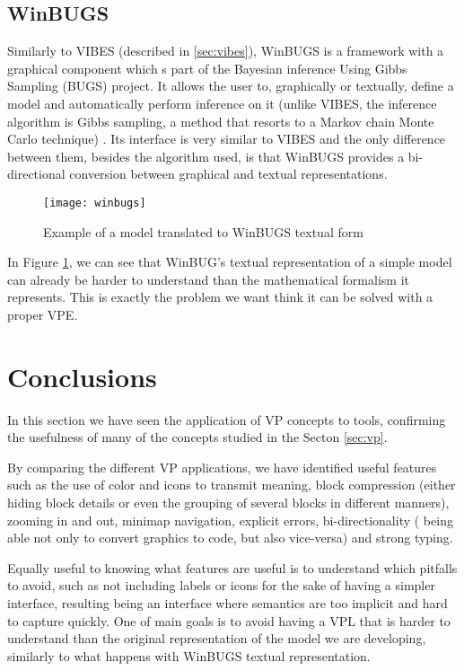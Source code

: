 \subsection{WinBUGS}
\label{sec:wbugs}

Similarly to VIBES (described in \ref{sec:vibes}), WinBUGS is a framework with a graphical
component which s part of the Bayesian inference Using Gibbs Sampling (BUGS) project.
It allows the user to, graphically or textually, define a model and automatically perform inference
on it (unlike VIBES, the inference algorithm is Gibbs sampling, a method that
resorts to a Markov chain Monte Carlo technique) \cite{Lunn2000}.
Its interface is very similar to VIBES and the only difference between them,
besides the algorithm used, is that WinBUGS provides a bi-directional conversion
between graphical and textual representations.

\begin{figure}[t]
  \begin{center}
    \leavevmode
    \texttt{[image: winbugs]}
    \caption{Example of a model translated to WinBUGS textual form \cite{winbugs}}
    \label{fig:winbugs}
  \end{center}
\end{figure}

In Figure \ref{fig:winbugs}, we can see that WinBUG's textual representation of
a simple model can already be harder to understand than the mathematical
formalism it represents. This is exactly the problem we want think it can be
solved with a proper VPE.

\section{Conclusions}

In this section we have seen the application of VP concepts to tools, confirming
the usefulness of many of the concepts studied in the Secton \ref{sec:vp}.

By comparing the different VP applications, we have identified useful features
such as the use of color and icons to transmit meaning, block compression (either
hiding block details or even the grouping of several blocks in different manners),
zooming in and out, minimap navigation, explicit errors, bi-directionality (
being able not only to convert graphics to code, but also vice-versa) and strong typing.

Equally useful to knowing what features are useful is to understand which pitfalls
to avoid, such as not including labels or icons for the sake of having a simpler
interface, resulting being an interface where semantics are too implicit and
hard to capture quickly. One of main goals is to avoid having a VPL that is harder to understand
than the original representation of the model we are developing, similarly to
what happens with WinBUGS textual representation.
